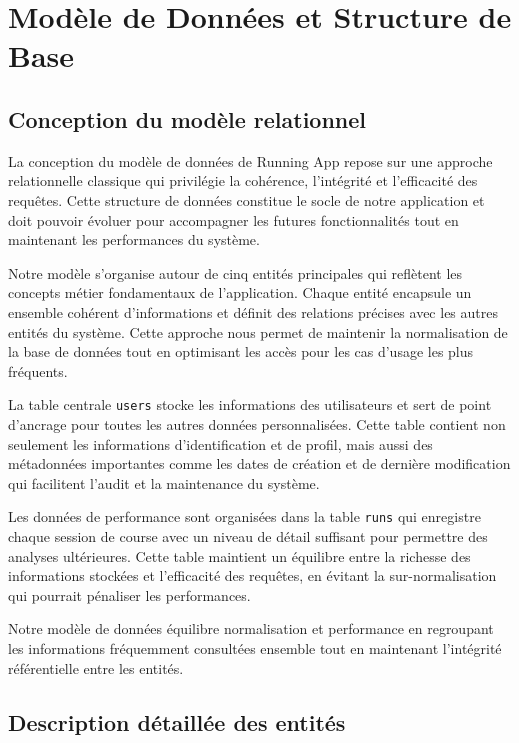 \section{Modèle de Données et Structure de Base}

\subsection{Conception du modèle relationnel}

La conception du modèle de données de Running App repose sur une approche relationnelle classique qui privilégie la cohérence, l'intégrité et l'efficacité des requêtes. Cette structure de données constitue le socle de notre application et doit pouvoir évoluer pour accompagner les futures fonctionnalités tout en maintenant les performances du système.

Notre modèle s'organise autour de cinq entités principales qui reflètent les concepts métier fondamentaux de l'application. Chaque entité encapsule un ensemble cohérent d'informations et définit des relations précises avec les autres entités du système. Cette approche nous permet de maintenir la normalisation de la base de données tout en optimisant les accès pour les cas d'usage les plus fréquents.

La table centrale \texttt{users} stocke les informations des utilisateurs et sert de point d'ancrage pour toutes les autres données personnalisées. Cette table contient non seulement les informations d'identification et de profil, mais aussi des métadonnées importantes comme les dates de création et de dernière modification qui facilitent l'audit et la maintenance du système.

Les données de performance sont organisées dans la table \texttt{runs} qui enregistre chaque session de course avec un niveau de détail suffisant pour permettre des analyses ultérieures. Cette table maintient un équilibre entre la richesse des informations stockées et l'efficacité des requêtes, en évitant la sur-normalisation qui pourrait pénaliser les performances.

\begin{infobox}
Notre modèle de données équilibre normalisation et performance en regroupant les informations fréquemment consultées ensemble tout en maintenant l'intégrité référentielle entre les entités.
\end{infobox}

\subsection{Description détaillée des entités}

